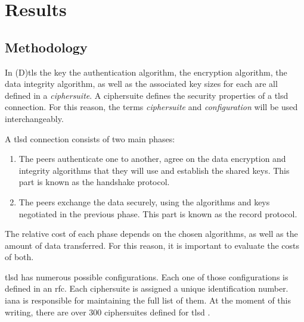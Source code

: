 
\chapter{Results}
\label{chapter:results}

\section{Methodology}

In (D)\gls{tls} the key the authentication algorithm, the encryption algorithm, the
data integrity algorithm, as well as the associated key sizes for each are all defined in a \textit{ciphersuite}.
A ciphersuite defines the security properties of a \acrshort{tlsd} connection. For this reason, the terms
\textit{ciphersuite} and \textit{configuration} will be used interchangeably.

A \gls{tlsd} connection consists of two main phases:
\begin{enumerate}
  \item The peers authenticate one to another, agree on the data encryption and integrity
  algorithms that they will use and establish the shared keys. This part is known as the handshake protocol.
 \item The peers exchange the data securely, using the algorithms and keys negotiated in
the previous phase. This part is known as the record protocol.
\end{enumerate}

The relative cost of each phase depends on the chosen algorithms, as well as the amount of data
transferred. For this reason, it is important to evaluate the costs of both.

\acrshort{tlsd} has numerous possible configurations. Each one of those configurations is defined
in an \gls{rfc}. Each ciphersuite is assigned a unique identification number. \gls{iana} is responsible for
maintaining the full list of them. At the moment of this writing, there are over $300$ ciphersuites
defined for \gls{tlsd} \cite{IANA_ciphers_list:online}.

